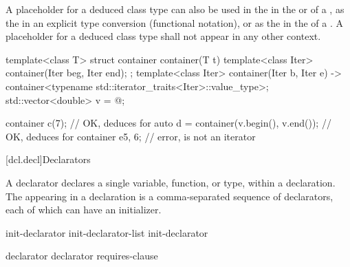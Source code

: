 \pnum
A placeholder for a deduced class type
can also be used
in the 
in the  or 
of a ,
as the 
in an explicit type conversion (functional notation),
or
as the  in the 
of a .
A placeholder for a deduced class type
shall not appear in any other context.

\pnum
\begin{example}
\begin{codeblock}
template<class T> struct container {
    container(T t) {}
    template<class Iter> container(Iter beg, Iter end);
};
template<class Iter>
container(Iter b, Iter e) -> container<typename std::iterator_traits<Iter>::value_type>;
std::vector<double> v = { @\commentellip@ };

container c(7);                         // OK, deduces  for 
auto d = container(v.begin(), v.end()); // OK, deduces  for 
container e{5, 6};                      // error,  is not an iterator
\end{codeblock}
\end{example}
%

[dcl.decl]{Declarators}%

%
%
%
%
%

\pnum
A declarator declares a single variable, function, or type, within a declaration.
The
appearing in a declaration
is a comma-separated sequence of declarators,
each of which can have an initializer.

\begin{bnf}
\br
    init-declarator\br
    init-declarator-list \terminal{,} init-declarator
\end{bnf}

\begin{bnf}
\br
    declarator \br
    declarator requires-clause
\end{bnf}

